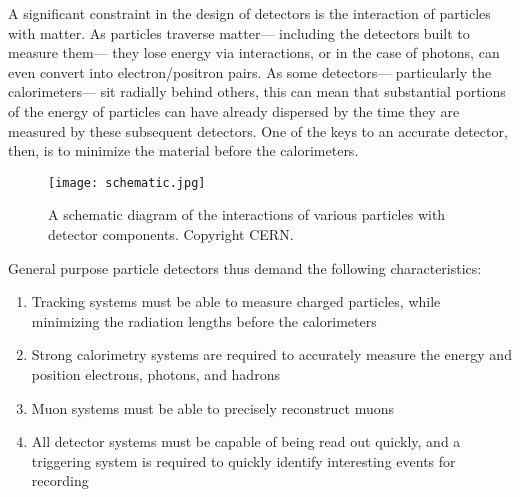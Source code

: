 A significant constraint in the design of detectors is the interaction of particles with matter. As particles traverse matter--- including the detectors built to measure them--- they lose energy via interactions, or in the case of photons, can even convert into electron/positron pairs. As some detectors--- particularly the calorimeters--- sit radially behind others, this can mean that substantial portions of the energy of particles can have already dispersed by the time they are measured by these subsequent detectors. One of the keys to an accurate detector, then, is to minimize the material before the calorimeters. 



\begin{figure}
\centering
\texttt{[image: schematic.jpg]}
\label{fig:detector:schematic}
\caption{A schematic diagram of the interactions of various particles with detector components. Copyright CERN.}
\end{figure}


General purpose particle detectors thus demand the following characteristics: 

\begin{enumerate}
	\item Tracking systems must be able to measure charged particles, while minimizing the radiation lengths before the calorimeters
	\item Strong calorimetry systems are required to accurately measure the energy and position electrons, photons, and hadrons
	\item Muon systems must be able to precisely reconstruct muons
	\item All detector systems must be capable of being read out quickly, and a triggering system is required to quickly identify interesting events for recording
\end{enumerate}

